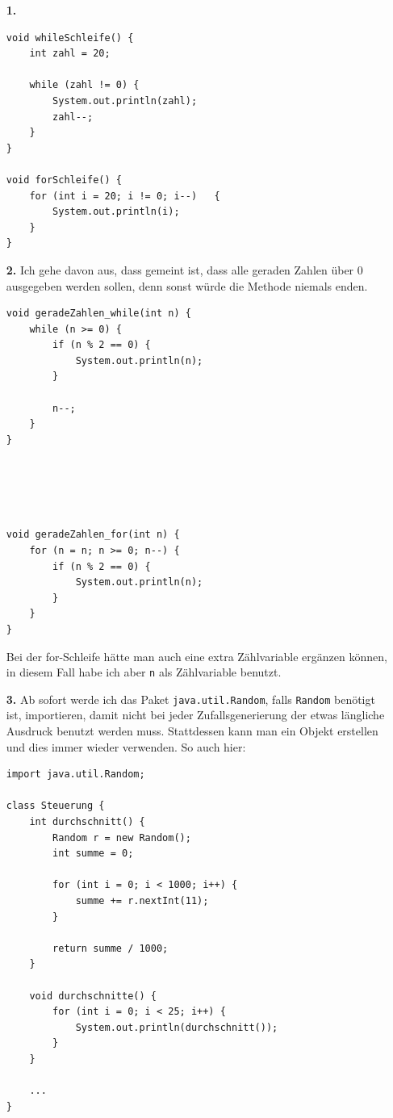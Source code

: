 \documentclass{scrartcl}   %
\begin{document}
\begin{itemize}
    \item[\textbf{1.}]
    \begin{lstlisting}
void whileSchleife() {
    int zahl = 20;
    
    while (zahl != 0) {
        System.out.println(zahl);
        zahl--;
    }
}

void forSchleife() {
    for (int i = 20; i != 0; i--)   {
        System.out.println(i);
    }
}
    \end{lstlisting}
    \item[\textbf{2.}] Ich gehe davon aus, dass gemeint ist, dass alle geraden Zahlen über 0 ausgegeben werden sollen, denn sonst würde die Methode niemals enden.\\
    \begin{lstlisting}
void geradeZahlen_while(int n) {
    while (n >= 0) {
        if (n % 2 == 0) {
            System.out.println(n);
        }
        
        n--;
    }
}





void geradeZahlen_for(int n) {
    for (n = n; n >= 0; n--) {
        if (n % 2 == 0) {
            System.out.println(n);
        }
    }
}
    \end{lstlisting}
    Bei der for-Schleife hätte man auch eine extra Zählvariable ergänzen können, in diesem Fall habe ich aber \texttt{n} als Zählvariable benutzt.
    \item[\textbf{3.}] Ab sofort werde ich das Paket \texttt{java.util.Random}, falls \texttt{Random} benötigt ist, importieren, damit nicht bei jeder Zufallsgenerierung der \glqq etwas längliche \grqq{} Ausdruck benutzt werden muss. Stattdessen kann man ein Objekt erstellen und dies immer wieder verwenden. So auch hier:\\
    \begin{lstlisting}
import java.util.Random;

class Steuerung {
    int durchschnitt() {
        Random r = new Random();
        int summe = 0;

        for (int i = 0; i < 1000; i++) {
            summe += r.nextInt(11);
        }

        return summe / 1000;
    }

    void durchschnitte() {
        for (int i = 0; i < 25; i++) {
            System.out.println(durchschnitt());
        }
    }

    ...
}
    \end{lstlisting}
    

\end{itemize}
\end{document}
